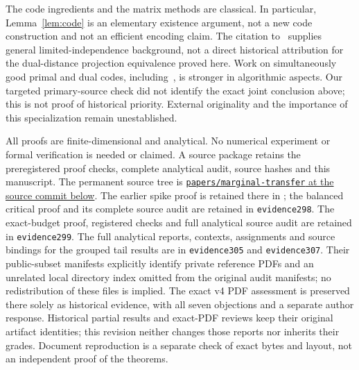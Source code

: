 \documentclass[11pt]{article}
\providecommand{\SourceCommit}{SOURCE-NOT-BUILT}
\begin{document}
The code ingredients and the matrix methods are classical. In particular,
Lemma~\ref{lem:code} is an elementary existence argument, not a new code
construction and not an efficient encoding claim. The citation to~\cite{AGM} supplies general limited-independence background, not a direct historical attribution for the dual-distance projection equivalence proved here. Work on simultaneously
good primal and dual codes, including~\cite{BrehmResch}, is stronger in
algorithmic aspects. Our targeted primary-source check did not identify
the exact joint conclusion above; this is not proof of historical priority.
External originality and the importance of this specialization remain
unestablished.

All proofs are finite-dimensional and analytical. No numerical experiment
or formal verification is needed or claimed. A source package retains the
preregistered proof checks, complete analytical audit, source hashes and
this manuscript. The permanent source tree is
\href{https://github.com/lluiseriksson/THE-ERIKSSON-PROGRAMME/tree/\SourceCommit/papers/marginal-transfer}{\texttt{papers/marginal-transfer} at the source commit below}.
The earlier spike proof is retained there in
; the balanced critical proof and
its complete source audit are retained in \texttt{evidence298}.
The exact-budget proof, registered checks and full analytical source
audit are retained in \texttt{evidence299}. The full analytical reports,
contexts, assignments and source bindings for the grouped tail results are
in \texttt{evidence305} and \texttt{evidence307}. Their public-subset manifests explicitly identify
private reference PDFs and an unrelated local directory index omitted from
the original audit manifests; no redistribution of these files is implied.
The exact v4 PDF assessment is preserved there solely as historical evidence,
with all seven objections and a separate author response. Historical partial results
and exact-PDF reviews keep their original artifact identities; this
revision neither changes those reports nor inherits their grades.
Document reproduction is a separate check of exact bytes
and layout, not an independent proof of the theorems.
\end{document}
